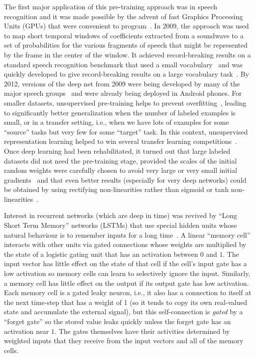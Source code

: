 \documentclass[10pts]{article}
\begin{document}
The first major application of this pre-training approach was in speech
recognition and it was made possible by the advent of fast Graphics
Processing Units (GPUs) that were convenient to
program~\citep{RainaICML09-small}.  In 2009, the approach was used to map
short temporal windows of coefficients extracted from a soundwave to a set
of probabilities for the various fragments of speech that might be
represented by the frame in the center of the window.  It achieved
record-breaking results on a standard speech recognition benchmark that
used a small vocabulary~\citep{TIMITpaper} and was quickly developed to
give record-breaking results on a large vocabulary task~\citep{Dahl2012}.
By 2012, versions of the deep net from 2009 were being developed by many of
the major speech groups~\citep{Hinton-et-al-2012} and were already being
deployed in Android phones.  For smaller datasets, unsupervised
pre-training helps to prevent overfitting~\citep{Erhan+al-2010-small},
leading to significantly better generalization when the number of labeled
examples is small, or in a transfer setting, i.e., when we have lots of
examples for some ``source'' tasks but very few for some ``target''
task. In this context, unsupervised representation learning helped to win
several transfer learning
competitions~\citep{UTLC+LISA-2011-small,Goodfellow-icml2012}.  Once deep
learning had been rehabilitated, it turned out that large labeled datasets
did not need the pre-training stage, provided the scales of the initial
random weights were carefully chosen to avoid very large or very small
initial gradients~\citep{GlorotAISTATS2010-small} and that even better
results (especially for very deep networks)
could be obtained by using rectifying non-linearities rather than
sigmoid or tanh
non-linearities~\citep{Glorot+al-AI-2011-small,Krizhevsky-2012-small}.

Interest in recurrent networks (which are deep in time) was revived by
``Long Short Term Memory'' networks (LSTMs) that use special hidden units
whose natural behaviour is to remember inputs for a long
time~\citep{Hochreiter+Schmidhuber-1997}.  
A linear ``memory cell'' interacts with other units
via gated connections whose weights are multiplied by the state of a
logistic gating unit that has an activation between $0$ and $1$. The input
vector has little effect on the state of that cell if the cell's input
gate has a low activation so memory cells can learn to selectively ignore
the input.  Similarly, a memory cell has little effect on the output if its
output gate has low activation. Each memory cell is a gated leaky neuron, i.e.,
it also has a connection to
itself at the next time-step that has a weight of 1 (so it tends to copy its
own real-valued state and accumulate the external signal), 
but this self-connection is {\em gated} by a ``forget gate'' so
the stored value leaks quickly unless the forget gate has an activation
near $1$.  The gates themselves have their activities determined by
weighted inputs that they receive from the input vectors and all of the
memory cells.
\end{document}
